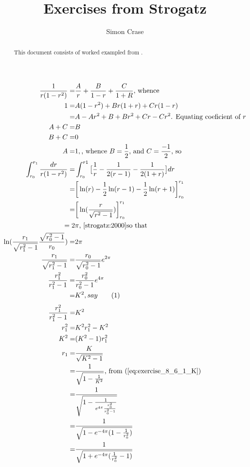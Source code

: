 \documentclass[]{article}
\title{Exercises from Strogatz}
\author{Simon Crase}
\newcommand\numberthis{\addtocounter{equation}{1}\tag{\theequation}}
\begin{document}
\maketitle

\begin{abstract}
This document consists of worked exampled from \cite{strogatz:2000}.
\end{abstract}

\section{}

\begin{align*}
\frac{1}{r(1-r^2)}=&\frac{A}{r} + \frac{B}{1-r} + \frac{C}{1+R}\text{, whence}\\
1 =& A(1-r^2) + B r(1+r) + Cr(1-r)\\
=& A -A r^2 + B + B r^2 +Cr -Cr^2\text{. Equating coeficient of $r$}\\
A + C =& B\\
B + C =& 0\\
A=& 1,\text{, whence $B=\frac{1}{2}$, and $C=\frac{-1}{2}$, so}\\
\int_{r_0}^{r_1}\frac{dr}{r(1-r^2)}=&\int_{r_0}^{r1} \big[\frac{1}{r}-\frac{1}{2(r-1)}-\frac{1}{2(1+r)}\big] dr\\
=&\bigg[\ln(r)-\frac{1}{2}\ln(r-1)-\frac{1}{2}\ln(r+1)\bigg]_{r_0}^{r_1}\\
=&\bigg[\ln(\frac{r}{\sqrt{r^2-1}})\bigg]_{r_0}^{r_1}\\
=2&\pi\text{, \cite[Example 8.7.1]{strogatz:2000}so that}\\
\ln(\frac{r_1}{\sqrt{r_1^2-1}}\frac{\sqrt{r_0^2-1}}{r_0})=&2 \pi\\
\frac{r_1}{\sqrt{r_1^2-1}}=&\frac{r_0}{\sqrt{r_0^2-1}} e^{2 \pi}\\
\frac{r_1^2}{r_1^2-1}=&\frac{r_0^2}{r_0^2-1} e^{4 \pi}\\
=&K^2{, say}\numberthis\label{eq:exercise_8_6_1_K}
\end{align*}
\begin{align*}
\frac{r_1^2}{r_1^2-1}=&K^2\\
r_1^2=&K^2 r_1^2 - K^2\\
K^2 =& (K^2-1)r_1^2\\
r_1=&\frac{K}{\sqrt{K^2-1}}\\
=&\frac{1}{\sqrt{1-\frac{1}{K^2}}}\text{, from (\ref{eq:exercise_8_6_1_K})}\\
=&\frac{1}{\sqrt{1-\frac{1}{e^{4 \pi} \frac{r_0^2}{r_0^2-1}}}}\\
=&\frac{1}{\sqrt{1-e^{-4\pi}(1-\frac{1}{r_0^2})}}\\
=&\frac{1}{\sqrt{1+e^{-4\pi}(\frac{1}{r_0^2}-1)}}
\end{align*}




\end{document}
